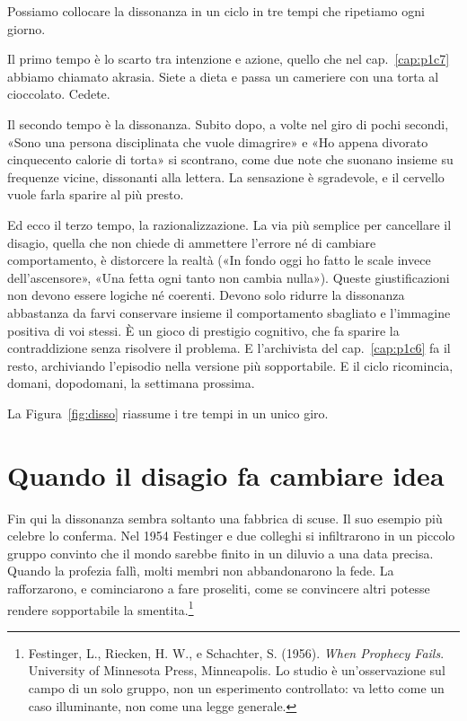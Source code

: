 Possiamo collocare la dissonanza in un ciclo in tre tempi che ripetiamo ogni giorno.

Il primo tempo è lo scarto tra intenzione e azione, quello che nel cap.~\ref{cap:p1c7} abbiamo chiamato akrasia. Siete a dieta e passa un cameriere con una torta al cioccolato. Cedete.

Il secondo tempo è la dissonanza. Subito dopo, a volte nel giro di pochi secondi, «Sono una persona disciplinata che vuole dimagrire» e «Ho appena divorato cinquecento calorie di torta» si scontrano, come due note che suonano insieme su frequenze vicine, dissonanti alla lettera. La sensazione è sgradevole, e il cervello vuole farla sparire al più presto.

Ed ecco il terzo tempo, la razionalizzazione. La via più semplice per cancellare il disagio, quella che non chiede di ammettere l'errore né di cambiare comportamento, è distorcere la realtà («In fondo oggi ho fatto le scale invece dell'ascensore», «Una fetta ogni tanto non cambia nulla»). Queste giustificazioni non devono essere logiche né coerenti. Devono solo ridurre la dissonanza abbastanza da farvi conservare insieme il comportamento sbagliato e l'immagine positiva di voi stessi. È un gioco di prestigio cognitivo, che fa sparire la contraddizione senza risolvere il problema. E l'archivista del cap.~\ref{cap:p1c6} fa il resto, archiviando l'episodio nella versione più sopportabile. E il ciclo ricomincia, domani, dopodomani, la settimana prossima.

La Figura~\ref{fig:disso} riassume i tre tempi in un unico giro.


\section{Quando il disagio fa cambiare idea}

Fin qui la dissonanza sembra soltanto una fabbrica di scuse. Il suo esempio più celebre lo conferma. Nel 1954 Festinger e due colleghi si infiltrarono in un piccolo gruppo convinto che il mondo sarebbe finito in un diluvio a una data precisa. Quando la profezia fallì, molti membri non abbandonarono la fede. La rafforzarono, e cominciarono a fare proseliti, come se convincere altri potesse rendere sopportabile la smentita.\footnote{Festinger, L., Riecken, H. W., e Schachter, S. (1956). \textit{When Prophecy Fails}. University of Minnesota Press, Minneapolis. Lo studio è un'osservazione sul campo di un solo gruppo, non un esperimento controllato: va letto come un caso illuminante, non come una legge generale.}

